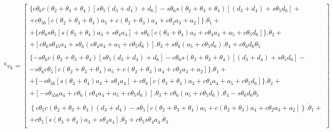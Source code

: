 \begin{equation}
\begin{gathered}
    ^6v_6 = \begin{bmatrix}
        \{c\theta_6c(\theta_2 + \theta_3 + \theta_4)[s\theta_5(d_3+d_4) + d_6] - s\theta_6s(\theta_2 + \theta_3 + \theta_4)[(d_3+d_4) + s\theta_5d_6] + \\
        +c\theta_{56}[c(\theta_2 + \theta_3 + \theta_4)a_5 + c(\theta_2 + \theta_3)a_4 + c\theta_2a_3 + a_2]\}.\dot{\theta}_1 + \\
        +\{c\theta_6s\theta_5[s(\theta_3+\theta_4)a_3 + s\theta_4a_4] + s\theta_6[c(\theta_3+\theta_4)a_3 + c\theta_4a_4 + a_5 + c\theta_5d_6]\}.\dot{\theta}_2 + \\
        +[c\theta_6s\theta_{45}a_4 + s\theta_6(c\theta_4a_4 + a_5 + c\theta_5d_6)].\dot{\theta}_3 + s\theta_6(a_5 + c\theta_5d_6).\dot{\theta}_4 + c\theta_6d_6\dot{\theta}_5 \\ 
        \\
        \{-s\theta_6c(\theta_2 + \theta_3 + \theta_4)[s\theta_5(d_3+d_4) + d_6] - c\theta_6s(\theta_2 + \theta_3 + \theta_4)[(d_3+d_4) + s\theta_5d_6] - \\
        -s\theta_6c\theta_5[c(\theta_2 + \theta_3 + \theta_4)a_5 + c(\theta_2 + \theta_3)a_4 + c\theta_2a_3 + a_2]\}.\dot{\theta}_1 + \\
        +\{-s\theta_{56}[s(\theta_3+\theta_4)a_3 + s\theta_4a_4] + c\theta_6[c(\theta_3+\theta_4)a_3 + c\theta_4a_4 + a_5 + c\theta_5d_6]\}.\dot{\theta}_2 + \\
        +[-s\theta_{456}a_4 + c\theta_6(c\theta_4a_4 + a_5 + c\theta_5d_6)].\dot{\theta}_3 + c\theta_6(a_5 + c\theta_5d_6).\dot{\theta}_4 - s\theta_6d_6\dot{\theta}_5 \\ 
        \\
        \left\{c\theta_5c(\theta_2 + \theta_3 + \theta_4)(d_3+d_4) - s\theta_5[c(\theta_2 + \theta_3 + \theta_4)a_5 + c(\theta_2 + \theta_3)a_4 + c\theta_2a_3 + a_2]\right\}.\dot{\theta}_1 + \\
        + c\theta_5[s(\theta_3+\theta_4)a_3 + s\theta_4a_4].\dot{\theta}_2 + c\theta_5s\theta_4a_4.\dot{\theta}_3 \\ 
    \end{bmatrix}
\end{gathered}
\end{equation}